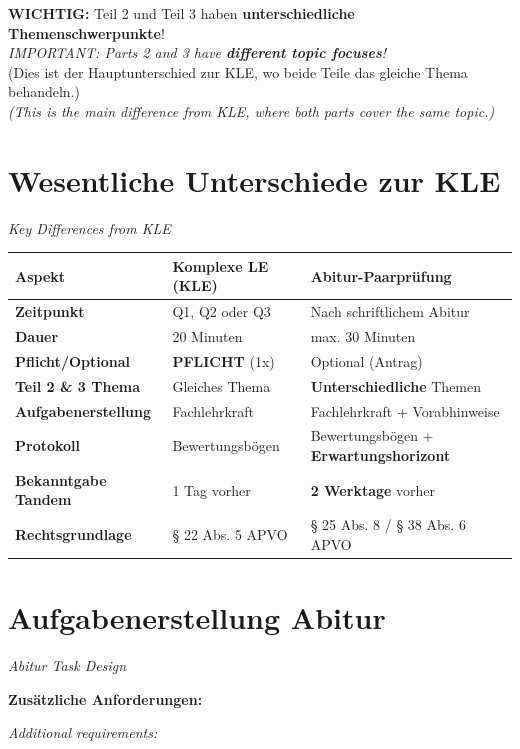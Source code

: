 \documentclass[11pt,a4paper]{article}
\newcommand{\bipar}[2]{%
    #1\par\vspace{2pt}%
    {\small\color{englishgray}\textit{#2}}\par\vspace{8pt}%
}
\newcommand{\bisection}[2]{%
    \section{#1}%
    {\small\color{englishgray}\textit{#2}}\par\vspace{6pt}%
}
\begin{document}
\begin{warnbox}
\textbf{WICHTIG:} Teil 2 und Teil 3 haben \textbf{unterschiedliche Themenschwerpunkte}!\\
{\color{englishgray}\textit{IMPORTANT: Parts 2 and 3 have \textbf{different topic focuses}!}}\\[0.2cm]
(Dies ist der Hauptunterschied zur KLE, wo beide Teile das gleiche Thema behandeln.)\\
{\color{englishgray}\textit{(This is the main difference from KLE, where both parts cover the same topic.)}}
\end{warnbox}

\bisection{Wesentliche Unterschiede zur KLE}{Key Differences from KLE}

\begin{center}
\begin{tabularx}{\textwidth}{|l|X|X|}
\hline
\rowcolor{spanischrot}\color{white}\textbf{Aspekt} & \color{white}\textbf{Komplexe LE (KLE)} & \color{white}\textbf{Abitur-Paarprüfung} \\
\hline
\textbf{Zeitpunkt} & Q1, Q2 oder Q3 & Nach schriftlichem Abitur \\
\hline
\textbf{Dauer} & 20 Minuten & max. 30 Minuten \\
\hline
\textbf{Pflicht/Optional} & \textbf{PFLICHT} (1x) & Optional (Antrag) \\
\hline
\textbf{Teil 2 \& 3 Thema} & Gleiches Thema & \textbf{Unterschiedliche} Themen \\
\hline
\textbf{Aufgabenerstellung} & Fachlehrkraft & Fachlehrkraft + Vorabhinweise \\
\hline
\textbf{Protokoll} & Bewertungsbögen & Bewertungsbögen + \textbf{Erwartungshorizont} \\
\hline
\textbf{Bekanntgabe Tandem} & 1 Tag vorher & \textbf{2 Werktage} vorher \\
\hline
\textbf{Rechtsgrundlage} & § 22 Abs. 5 APVO & § 25 Abs. 8 / § 38 Abs. 6 APVO \\
\hline
\end{tabularx}
\end{center}

\bisection{Aufgabenerstellung Abitur}{Abitur Task Design}

\bipar{\textbf{Zusätzliche Anforderungen:}}{Additional requirements:}
\end{document}
